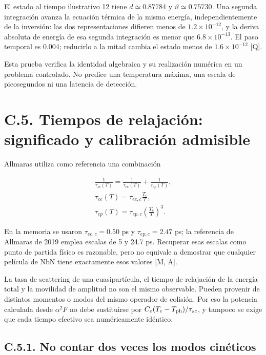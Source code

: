 \documentclass[
  spanish,
  10pt,
  a4paper,
]{article}
\begin{document}
El estado al tiempo ilustrativo 12 tiene \(d\simeq0.87784\) y
\(\vartheta\simeq0.75730\). Una segunda integración avanza la ecuación
térmica de la misma energía, independientemente de la inversión: las dos
representaciones difieren menos de \(1.2\times10^{-12}\), y la deriva
absoluta de energía de esa segunda integración es menor que
\(6.8\times10^{-13}\). El paso temporal es 0.004; reducirlo a la mitad
cambia el estado menos de \(1.6\times10^{-12}\) {[}Q{]}.

Esta prueba verifica la identidad algebraica y su realización numérica
en un problema controlado. No predice una temperatura máxima, una escala
de picosegundos ni una latencia de detección.

\section{C.5. Tiempos de relajación: significado y calibración
admisible}\label{c.5.-tiempos-de-relajaciuxf3n-significado-y-calibraciuxf3n-admisible}

Allmaras utiliza como referencia una combinación

\[
\begin{gathered}
\frac1{\tau_{sc}(T)}=\frac1{\tau_{ee}(T)}+\frac1{\tau_{ep}(T)},\\
\tau_{ee}(T)=\tau_{ee,c}\frac{T_c}{T},\\
\tau_{ep}(T)=\tau_{ep,c}\left(\frac{T_c}{T}\right)^3.
\end{gathered} \tag{C.21}
\]

En la memoria se usaron \(\tau_{ee,c}=0.50\) ps y \(\tau_{ep,c}=2.47\)
ps; la referencia de Allmaras de 2019 emplea escalas de 5 y 24.7 ps.
Recuperar esas escalas como punto de partida físico es razonable, pero
no equivale a demostrar que cualquier película de NbN tiene exactamente
esos valores {[}M, A{]}.

La tasa de scattering de una cuasipartícula, el tiempo de relajación de
la energía total y la movilidad de amplitud no son el mismo observable.
Pueden provenir de distintos momentos o modos del mismo operador de
colisión. Por eso la potencia calculada desde \(\alpha^2F\) no debe
sustituirse por \(C_e(T_e-T_{\rm ph})/\tau_{sc}\), y tampoco se exige
que cada tiempo efectivo sea numéricamente idéntico.

\subsection{C.5.1. No contar dos veces los modos
cinéticos}\label{c.5.1.-no-contar-dos-veces-los-modos-cinuxe9ticos}
\end{document}
